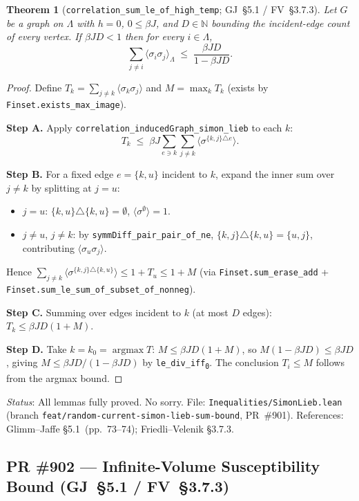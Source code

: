 \documentclass[a4paper,11pt]{article}
\newtheorem{theorem}{Theorem}
\begin{document}
\begin{theorem}[\texttt{correlation\_sum\_le\_of\_high\_temp}; GJ~\S5.1 / FV~\S3.7.3]
  Let $G$ be a graph on $\Lambda$ with $h=0$, $0\le\beta J$, and
  $D\in\mathbb{N}$ bounding the incident-edge count of every vertex.
  If $\beta J D < 1$ then for every $i\in\Lambda$,
  \[
    \sum_{j\neq i}\langle\sigma_i\sigma_j\rangle_\Lambda
    \;\le\;
    \frac{\beta J D}{1-\beta J D}.
  \]
\end{theorem}
\begin{proof}
  Define $T_k = \sum_{j\neq k}\langle\sigma_k\sigma_j\rangle$
  and $M = \max_k T_k$ (exists by \texttt{Finset.exists\_max\_image}).

  \textbf{Step A.}  Apply \texttt{correlation\_inducedGraph\_simon\_lieb} to each $k$:
  \[
    T_k \;\le\; \beta J\sum_{e\ni k}\sum_{j\neq k}
    \langle\sigma^{\{k,j\}\triangle e}\rangle.
  \]

  \textbf{Step B.}  For a fixed edge $e = \{k,u\}$ incident to $k$, expand the inner sum
  over $j\neq k$ by splitting at $j=u$:
  \begin{itemize}
    \item $j=u$: $\{k,u\}\triangle\{k,u\}=\emptyset$, $\langle\sigma^\emptyset\rangle=1$.
    \item $j\neq u$, $j\neq k$: by \texttt{symmDiff\_pair\_pair\_of\_ne},
      $\{k,j\}\triangle\{k,u\}=\{u,j\}$, contributing $\langle\sigma_u\sigma_j\rangle$.
  \end{itemize}
  Hence $\sum_{j\neq k}\langle\sigma^{\{k,j\}\triangle\{k,u\}}\rangle
  \le 1 + T_u \le 1+M$
  (via \texttt{Finset.sum\_erase\_add} + \texttt{Finset.sum\_le\_sum\_of\_subset\_of\_nonneg}).

  \textbf{Step C.}  Summing over edges incident to $k$ (at most $D$ edges):
  $T_k \le \beta J D (1+M)$.

  \textbf{Step D.}  Take $k=k_0 = \operatorname{argmax}T$:
  $M \le \beta J D(1+M)$, so $M(1-\beta J D)\le\beta J D$, giving
  $M\le\beta J D/(1-\beta J D)$ by \texttt{le\_div\_iff\textsubscript{0}}.
  The conclusion $T_i\le M$ follows from the argmax bound.
\end{proof}

\noindent\textit{Status}: All lemmas fully proved. No sorry.
File: \texttt{Inequalities/SimonLieb.lean} (branch \texttt{feat/random-current-simon-lieb-sum-bound}, PR~\#901).
References: Glimm--Jaffe \S5.1~(pp.~73--74); Friedli--Velenik \S3.7.3.

\subsection*{PR \#902 --- Infinite-Volume Susceptibility Bound (GJ~\S5.1 / FV~\S3.7.3)}
\end{document}
